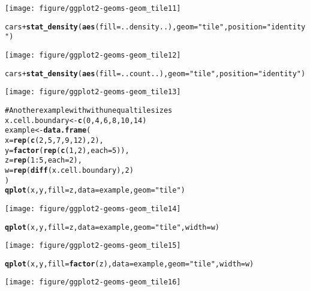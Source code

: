 \documentclass[a4paper,titlepage]{tufte-handout}\usepackage{graphicx, color}
\makeatletter
\def\maxwidth{ %
  \ifdim\Gin@nat@width>\linewidth
    \linewidth
  \else
    \Gin@nat@width
  \fi
}
\newcommand{\hlfunctioncall}[1]{\textcolor[rgb]{0.501960784313725,0,0.329411764705882}{\textbf{#1}}}%
\newcommand{\hlstring}[1]{\textcolor[rgb]{0.6,0.6,1}{#1}}%
\newcommand{\hlcomment}[1]{\textcolor[rgb]{0.180392156862745,0.6,0.341176470588235}{#1}}%
\newenvironment{kframe}{%
 \def\at@end@of@kframe{}%
 \ifinner\ifhmode%
  \def\at@end@of@kframe{\end{minipage}}%
  \begin{minipage}{\columnwidth}%
 \fi\fi%
 \def\FrameCommand##1{\hskip\@totalleftmargin \hskip-\fboxsep
 \colorbox{shadecolor}{##1}\hskip-\fboxsep
     \hskip-\linewidth \hskip-\@totalleftmargin \hskip\columnwidth}%
 \MakeFramed {\advance\hsize-\width
   \@totalleftmargin\z@ \linewidth\hsize
   \@setminipage}}%
 {\par\unskip\endMakeFramed%
 \at@end@of@kframe}
\newenvironment{knitrout}{}{} %
\makeatother
\begin{document}
\begin{knitrout}
\begin{kframe}
\begin{alltt}
\end{alltt}
\end{kframe}\texttt{[image: figure/ggplot2-geoms-geom\_tile11]} \begin{kframe}\begin{alltt}
cars + \hlfunctioncall{stat_density}(\hlfunctioncall{aes}(fill=..density..), geom=\hlstring{"tile"}, position=\hlstring{"identity"})
\end{alltt}
\end{kframe}\texttt{[image: figure/ggplot2-geoms-geom\_tile12]} \begin{kframe}\begin{alltt}
cars + \hlfunctioncall{stat_density}(\hlfunctioncall{aes}(fill=..count..), geom=\hlstring{"tile"}, position=\hlstring{"identity"})
\end{alltt}
\end{kframe}\texttt{[image: figure/ggplot2-geoms-geom\_tile13]} \begin{kframe}\begin{alltt}
\hlcomment{# Another example with with unequal tile sizes}
x.cell.boundary <- \hlfunctioncall{c}(0, 4, 6, 8, 10, 14)
example <- \hlfunctioncall{data.frame}(
  x = \hlfunctioncall{rep}(\hlfunctioncall{c}(2, 5, 7, 9, 12), 2),
  y = \hlfunctioncall{factor}(\hlfunctioncall{rep}(\hlfunctioncall{c}(1,2), each=5)),
  z = \hlfunctioncall{rep}(1:5, each=2),
  w = \hlfunctioncall{rep}(\hlfunctioncall{diff}(x.cell.boundary), 2)
)
\hlfunctioncall{qplot}(x, y, fill=z, data=example, geom=\hlstring{"tile"})
\end{alltt}
\end{kframe}\texttt{[image: figure/ggplot2-geoms-geom\_tile14]} \begin{kframe}\begin{alltt}
\hlfunctioncall{qplot}(x, y, fill=z, data=example, geom=\hlstring{"tile"}, width=w)
\end{alltt}
\end{kframe}\texttt{[image: figure/ggplot2-geoms-geom\_tile15]} \begin{kframe}\begin{alltt}
\hlfunctioncall{qplot}(x, y, fill=\hlfunctioncall{factor}(z), data=example, geom=\hlstring{"tile"}, width=w)
\end{alltt}
\end{kframe}\texttt{[image: figure/ggplot2-geoms-geom\_tile16]} \begin{kframe}\begin{alltt}

\end{alltt}
\end{kframe}
\end{knitrout}
\end{document}
